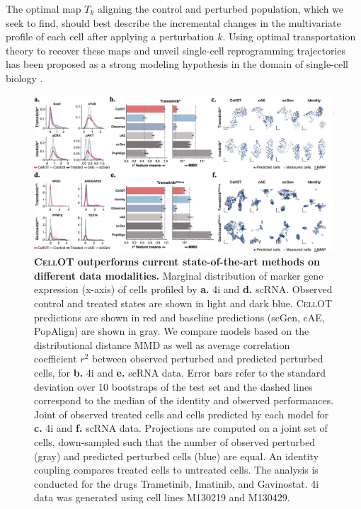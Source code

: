  The optimal map $T_k$ aligning the control and perturbed population, which we seek to find, should best describe the incremental changes in the multivariate profile of each cell after applying a perturbation $k$. Using optimal transportation theory \citep{villani2021topics, santambrogio2015optimal} to recover these maps and unveil single-cell reprogramming trajectories has been proposed as a strong modeling hypothesis in the domain of single-cell biology \citep{schiebinger2019optimal, cang2020inferring, demetci2022scot, huizing2022optimal, lavenant2021towards, zhang2021optimal}.
\begin{figure}
    \centering
    \includegraphics[width=\textwidth]{figures/fig_benchmark_cellot.png}
    \caption{ \textbf{\textsc{CellOT} outperforms current state-of-the-art methods on different data modalities.}  Marginal distribution of marker gene expression (x-axis) of cells profiled by \textbf{a.} 4i and \textbf{d.} scRNA. Observed control and treated states are shown in light and dark blue. \textsc{CellOT} predictions are shown in red and baseline predictions (scGen, cAE, PopAlign) are shown in gray. We compare models based on the distributional distance \acrshort{MMD} as well as average correlation coefficient $r^2$ between observed perturbed and predicted perturbed cells, for \textbf{b.} 4i and \textbf{e.} scRNA data. Error bars refer to the standard deviation over 10 bootstraps of the test set and the dashed lines correspond to the median of the identity and observed performances. Joint  of observed treated cells and cells predicted by each model for \textbf{c.} 4i and \textbf{f.} scRNA data. Projections are computed on a joint set of cells, down-sampled such that the number of observed perturbed (gray) and predicted perturbed cells (blue) are equal. An identity coupling compares treated cells to untreated cells. The analysis is conducted for the drugs Trametinib, Imatinib, and Gavinostat. 4i data was generated using cell lines M130219 and M130429.}
    \label{fig:benchmark_cellot}
\end{figure}
